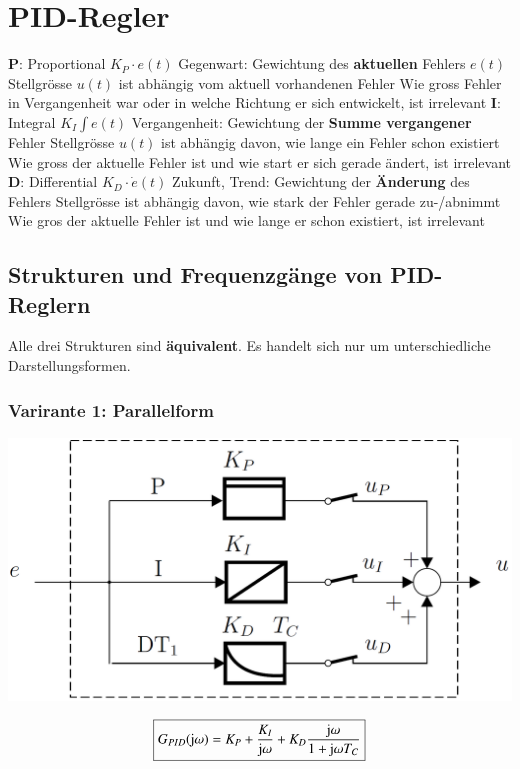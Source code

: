 \section{PID-Regler}

\begin{outline}
    \1 \textbf{P}: Proportional $K_P \cdot e(t)$
        \2 Gegenwart: Gewichtung des \textbf{aktuellen} Fehlers $e(t)$
            \3 Stellgrösse $u(t)$ ist abhängig vom aktuell vorhandenen Fehler
            \3 Wie gross Fehler in Vergangenheit war oder in welche Richtung er sich entwickelt, ist irrelevant
    \1 \textbf{I}: Integral $K_I \int e(t)$
        \2 Vergangenheit: Gewichtung der \textbf{Summe vergangener} Fehler
            \3  Stellgrösse $u(t)$ ist abhängig davon, wie lange ein Fehler schon existiert
            \3 Wie gross der aktuelle Fehler ist und wie start er sich gerade ändert, ist irrelevant
    \1 \textbf{D}: Differential $K_D \cdot \dot{e}(t)$
        \2 Zukunft, Trend: Gewichtung der \textbf{Änderung} des Fehlers
            \3 Stellgrösse ist abhängig davon, wie stark der Fehler gerade zu-/abnimmt
            \3 Wie gros der aktuelle Fehler ist und wie lange er schon existiert, ist irrelevant
\end{outline}


\subsection{Strukturen und Frequenzgänge von PID-Reglern}
\label{Strukturen PID-Regler}

Alle drei Strukturen sind \textbf{äquivalent}. Es handelt sich nur um unterschiedliche Darstellungsformen.


\subsubsection{Varirante 1: Parallelform}

\begin{minipage}[c]{0.4\columnwidth}
    \includegraphics[width=\columnwidth]{images/pid_regler_aufbau.png}
\end{minipage}
\hfill
\begin{minipage}[c]{0.48\columnwidth}
    $$ \boxed{ G_{PID}(\mathrm{j} \omega) = K_P + \frac{K_I}{\mathrm{j} \omega} + K_D \frac{\mathrm{j} \omega}{1 + \mathrm{j} \omega T_C} } $$
\end{minipage}



